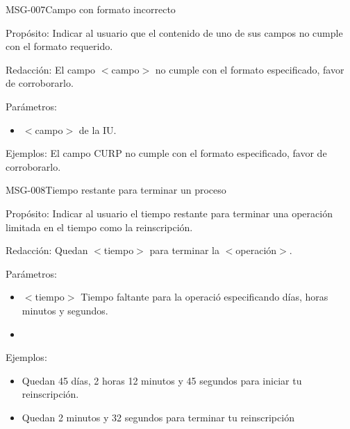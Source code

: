 \begin{cdtMessage}[msgErrorColor]{MSG-007}{Campo con formato incorrecto} 
	\item[Propósito:] Indicar al usuario que el contenido de uno de sus campos no cumple con el formato requerido.
	\item[Redacción:] El campo $<$campo$>$ no cumple con el formato especificado, favor de corroborarlo.
	\item[Parámetros:] \hspace{1cm}
	\begin{itemize}
		\item $<$campo$>$ de la IU.
	\end{itemize}
	\item[Ejemplos:] El campo CURP no cumple con el formato especificado, favor de corroborarlo.
\end{cdtMessage}
\begin{cdtMessage}{MSG-008}{Tiempo restante para terminar un proceso} 
	\item[Propósito:] Indicar al usuario el tiempo restante para terminar una operación limitada en el tiempo como la reinscripción.
	\item[Redacción:] Quedan $<$tiempo$>$ para terminar la $<$operación$>$.
	\item[Parámetros:] \hspace{1cm}
	\begin{itemize}
		\item $<$tiempo$>$ Tiempo faltante para la operació especificando días, horas minutos y segundos.
		\item 
	\end{itemize}
	\item[Ejemplos:] \hspace{1cm}
	\begin{itemize}
		\item Quedan 45 días, 2 horas 12 minutos y 45 segundos para iniciar tu reinscripción.
		\item Quedan 2 minutos y 32 segundos para terminar tu reinscripción
	\end{itemize}
\end{cdtMessage}

